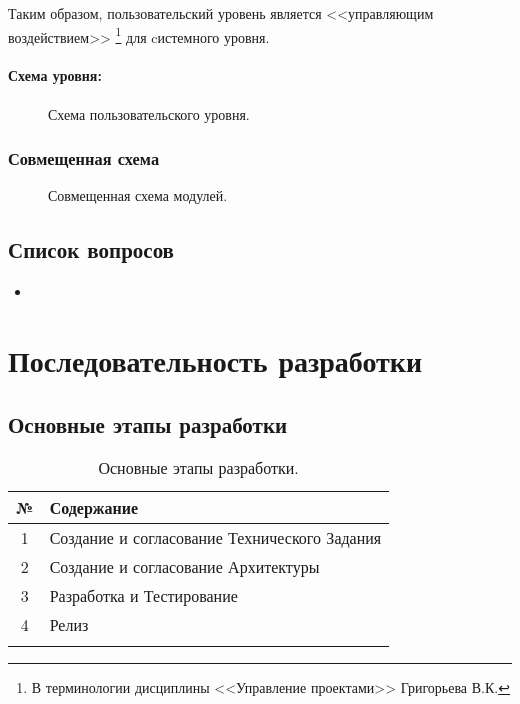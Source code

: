 \documentclass[12pt,a4paper,fullpage,titlepage]{article}
\begin{document}
Таким образом, пользовательский уровень является <<управляющим воздействием>> \footnote{В терминологии дисциплины <<Управление проектами>> Григорьева В.К.} для cистемного уровня.\\

\paragraph{Схема уровня:}
\begin{figure}[thbp!]
	\centering
	
	\caption{Схема пользовательского уровня.}
\end{figure}

\newpage
\subsubsection{Совмещенная схема}
\begin{figure}[thbp!]
	\centering
	
	\caption{Совмещенная схема модулей.}
\end{figure}

\newpage
\subsection{Список вопросов}
\begin{itemize}
	\item
\end{itemize}

\newpage
\section{Последовательность разработки}
\subsection{Основные этапы разработки}
\begin{table}[h]
\begin{tabularx}{\textwidth}{|c|X|}
	\hline
	 № & Содержание\\
	\hline
	1 & Создание и согласование Технического Задания\\
	\hline
	2 & Создание и согласование Архитектуры\\
	\hline
	3 & Разработка и Тестирование\\
	\hline
	4 & Релиз\\
	\hline
	 & \\
	\hline
\end{tabularx}
\caption{Основные этапы разработки.}
\end{table}
\end{document}
